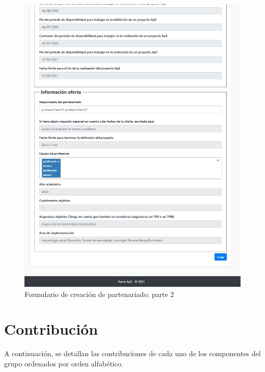 \documentclass[11pt]{book}
\begin{document}
 
 \begin{figure}[t]
 	\centering
 	\includegraphics[scale=0.9]{partenariado2}
 	\caption{Formulario de creación de partenariado: parte 2}
 \end{figure}

\chapter{Contribución}
A continuación, se detallan las contribuciones de cada uno de los componentes del grupo ordenados por orden alfabético.
\end{document}
